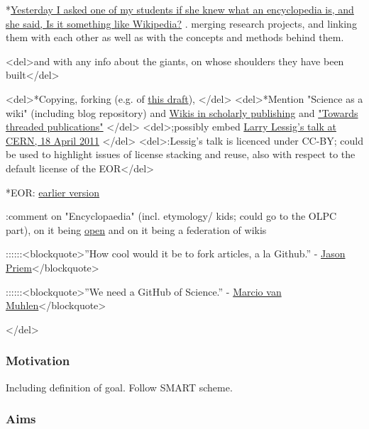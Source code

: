 \documentclass[final,authoryear,3p]{elsarticle-open-drafting}
\begin{document}
*\href{http://twitter.com/#!/egonwillighagen/statuses/39097468700336128}{Yesterday I asked one of my students if she knew what an encyclopedia is, and she said, Is it something like Wikipedia?}
. merging research projects, and linking them with each other as well as with the concepts and methods behind them.

<del>and with any info about the giants, on whose shoulders they have been built</del>

<del>*Copying, forking (e.g. of \href{http://species-id.net/w/index.php?title=Draft:Encyclopaedia_of_original_research&diff=prev&oldid=5076}{this draft}), </del>
<del>*Mention "Science as a wiki" (including blog repository) and \href{http://species-id.net/wiki/Wikis_in_scholarly_publishing}{Wikis in scholarly publishing} and \href{http://friendfeed.com/cameronneylon/c476db70/imo-this-is-possibly-single-most-useful-thing-we}{"Towards threaded publications"} </del>
<del>;possibly embed \href{http://vimeo.com/22633948}{Larry Lessig's talk at CERN, 18 April 2011} </del>
<del>:Lessig's talk is licenced under CC-BY; could be used to highlight issues of license stacking and reuse, also with respect to the default license of the EOR</del>

*EOR: \href{http://www.science3point0.com/coaspedia/index.php/Proposals:Wikimedia_Deutschland/2010/Wissenswert/Wissenschaft_als_Wiki/English}{earlier version}


:comment on "Encyclopaedia" (incl. etymology/ kids; could go to the OLPC part), on it being \href{http://www.opendefinition.org/}{open} and on it being a federation of wikis


::::::<blockquote>''How cool would it be to fork articles, a la Github.'' - \href{http://friendfeed.com/cameronneylon/c476db70/imo-this-is-possibly-single-most-useful-thing-we}{Jason Priem}</blockquote>

::::::<blockquote>''We need a GitHub of Science.'' - \href{http://marciovm.com/i-want-a-github-of-science}{Marcio van Muhlen}</blockquote>

</del>
\subsubsection{Motivation}
Including definition of goal. Follow SMART scheme.

\subsubsection{Aims}
\end{document}
